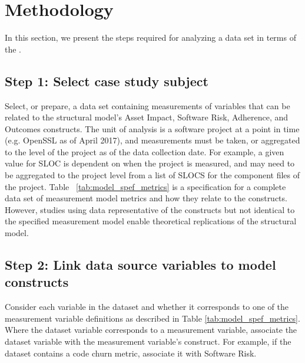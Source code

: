 \section{Methodology}
\label{sec:methodology}
In this section, we present the steps required for analyzing a data set in terms of the \ModelAbbr.

\subsection{Step 1: Select case study subject}
Select, or prepare, a data set containing measurements of  variables that can be related to the structural model's Asset Impact, Software Risk, Adherence, and Outcomes constructs. The unit of analysis is a software project at a point in time (e.g. OpenSSL as of April 2017), and measurements must be taken, or aggregated to the level of the project as of the data collection date. For example, a given value for SLOC is dependent on when the project is measured, and may need to be aggregated to the project level from a list of SLOCS for the component files of the project. Table ~\ref{tab:model_spef_metrics} is a specification for a complete data set of measurement model metrics and how they relate to the constructs. However, studies using data representative of the constructs but not identical to the specified measurement model enable theoretical replications of the structural model.     

\subsection{Step 2: Link data source variables to model constructs}
Consider each variable in the dataset and whether it corresponds to one of the measurement variable definitions as described in Table \ref{tab:model_spef_metrics}. Where the dataset variable corresponds to a measurement variable, associate the dataset variable with the measurement variable's construct. For example, if the dataset contains a code churn metric, associate it with Software Risk.

